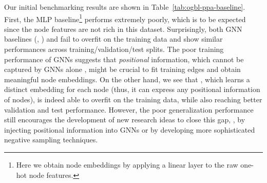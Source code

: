 {Our initial benchmarking results are shown in Table~\ref{tab:ogbl-ppa-baseline}.
First, the MLP baseline\footnote{Here we obtain node embeddings by applying a linear layer to the raw one-hot node features.} performs extremely poorly, which is to be expected since the node features are not rich in this dataset.
Surprisingly, both GNN baselines (, ) and  fail to overfit on the training data and show similar performances across training/validation/test splits.
The poor training performance of GNNs suggests that \emph{positional} information, which cannot be captured by GNNs alone \citep{you2019position}, might be crucial to fit training edges and obtain meaningful node embeddings.
On the other hand, we see that , which learns a distinct embedding for each node (thus, it can express any positional information of nodes), is indeed able to overfit on the training data, while also reaching better validation and test performance.
However, the poor generalization performance still encourages the development of new research ideas to close this gap, \eg, by injecting positional information into GNNs or by developing more sophisticated negative sampling techniques.}

